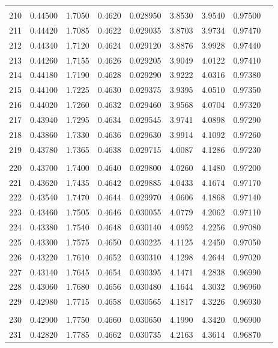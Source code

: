 \documentclass[letter,twosides,10pt]{article}
\begin{document}
\begin{longtable}{|c|c|c|c|c|c|c|c|c|}
 & & & & & & & \\
210 & 0.44500 & 1.7050 & 0.4620 & 0.028950 & 3.8530 &  3.9540 & 0.97500 \\
211 & 0.44420 & 1.7085 & 0.4622 & 0.029035 & 3.8703 &  3.9734 & 0.97470 \\
212 & 0.44340 & 1.7120 & 0.4624 & 0.029120 & 3.8876 &  3.9928 & 0.97440 \\
213 & 0.44260 & 1.7155 & 0.4626 & 0.029205 & 3.9049 &  4.0122 & 0.97410 \\
214 & 0.44180 & 1.7190 & 0.4628 & 0.029290 & 3.9222 &  4.0316 & 0.97380 \\
215 & 0.44100 & 1.7225 & 0.4630 & 0.029375 & 3.9395 &  4.0510 & 0.97350 \\
216 & 0.44020 & 1.7260 & 0.4632 & 0.029460 & 3.9568 &  4.0704 & 0.97320 \\
217 & 0.43940 & 1.7295 & 0.4634 & 0.029545 & 3.9741 &  4.0898 & 0.97290 \\
218 & 0.43860 & 1.7330 & 0.4636 & 0.029630 & 3.9914 &  4.1092 & 0.97260 \\
219 & 0.43780 & 1.7365 & 0.4638 & 0.029715 & 4.0087 &  4.1286 & 0.97230 \\
 & & & & & & & \\
220 & 0.43700 & 1.7400 & 0.4640 & 0.029800 & 4.0260 &  4.1480 & 0.97200 \\
221 & 0.43620 & 1.7435 & 0.4642 & 0.029885 & 4.0433 &  4.1674 & 0.97170 \\
222 & 0.43540 & 1.7470 & 0.4644 & 0.029970 & 4.0606 &  4.1868 & 0.97140 \\
223 & 0.43460 & 1.7505 & 0.4646 & 0.030055 & 4.0779 &  4.2062 & 0.97110 \\
224 & 0.43380 & 1.7540 & 0.4648 & 0.030140 & 4.0952 &  4.2256 & 0.97080 \\
225 & 0.43300 & 1.7575 & 0.4650 & 0.030225 & 4.1125 &  4.2450 & 0.97050 \\
226 & 0.43220 & 1.7610 & 0.4652 & 0.030310 & 4.1298 &  4.2644 & 0.97020 \\
227 & 0.43140 & 1.7645 & 0.4654 & 0.030395 & 4.1471 &  4.2838 & 0.96990 \\
228 & 0.43060 & 1.7680 & 0.4656 & 0.030480 & 4.1644 &  4.3032 & 0.96960 \\
229 & 0.42980 & 1.7715 & 0.4658 & 0.030565 & 4.1817 &  4.3226 & 0.96930 \\
 & & & & & & & \\
230 & 0.42900 & 1.7750 & 0.4660 & 0.030650 & 4.1990 &  4.3420 & 0.96900 \\
231 & 0.42820 & 1.7785 & 0.4662 & 0.030735 & 4.2163 &  4.3614 & 0.96870 \\

\end{longtable}
\end{document}
